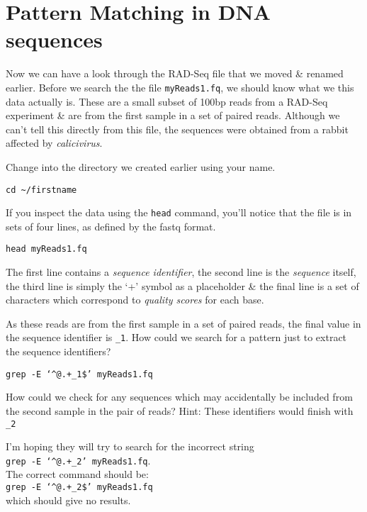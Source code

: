 \section{Pattern Matching in DNA sequences}
Now we can have a look through the RAD-Seq file that we moved \& renamed earlier.
Before we search the the file \texttt{myReads1.fq}, we should know what we this data actually is.
These are a small subset of 100bp reads from a RAD-Seq experiment \& are from the first sample in a set of paired reads.
Although we can't tell this directly from this file, the sequences were obtained from a rabbit affected by \textit{calicivirus}.
\begin{steps}
Change into the directory we created earlier using your name.
\begin{lstlisting}
cd ~/firstname
\end{lstlisting}
\end{steps}

\begin{steps}
If you inspect the data using the \texttt{head} command, you'll notice that the file is in sets of four lines, as defined by the fastq format.
\begin{lstlisting}
head myReads1.fq
\end{lstlisting}
The first line contains a \textit{sequence identifier}, the second line is the \textit{sequence} itself, the third line is simply the `+' symbol as a placeholder \& the final line is a set of characters which correspond to \textit{quality scores} for each base.
\end{steps}

\begin{questions}
As these reads are from the first sample in a set of paired reads, the final value in the sequence identifier is \texttt{\_1}.
How could we search for a pattern just to extract the sequence identifiers? \\
\begin{answer}
\texttt{grep -E `\^{}@.+\_1\$' myReads1.fq}
\end{answer}

How could we check for any sequences which may accidentally be included from the second sample in the pair of reads?
Hint: These identifiers would finish with \texttt{\_2} \\
\begin{answer}
I'm hoping they will try to search for the incorrect string \\
\texttt{grep -E `\^{}@.+\_2' myReads1.fq}.\\
The correct command should be: \\
\texttt{grep -E `\^{}@.+\_2\$' myReads1.fq} \\
which should give no results. \\
\end{answer}

\end{questions}

